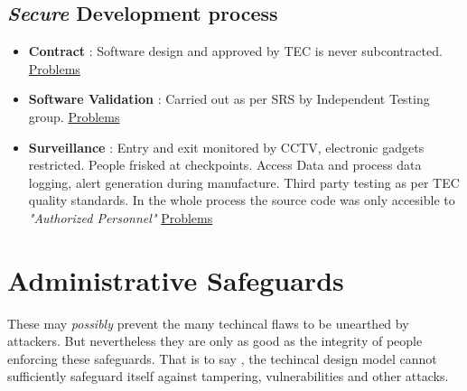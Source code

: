 \documentclass[12pt]{report}
\begin{document}
\subsection{\textit{Secure} Development process}
\begin{itemize}
  \item \textbf{Contract} : Software design and approved by TEC is never subcontracted. \hyperref[sec:contract]{Problems}
  \item \textbf{Software Validation} : Carried out as per SRS by Independent Testing group. \hyperref[sec:contract]{Problems}
  \item \textbf{Surveillance} : Entry and exit monitored by CCTV, electronic gadgets restricted. People frisked at checkpoints. Access Data and process data logging, alert generation during manufacture. Third party testing as per TEC quality standards. In the whole process the source code was only accesible to \textit{"Authorized Personnel"} \hyperref[sec:surv]{Problems}
\end{itemize}



\section{Administrative Safeguards}
These may \textit{possibly} prevent the many techincal flaws to be unearthed by attackers. But nevertheless they are only as good as the integrity of people enforcing these safeguards. That is to say , the techincal design model cannot sufficiently safeguard itself against tampering, vulnerabilities and other attacks.
\end{document}
